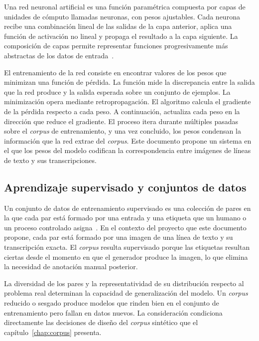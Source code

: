 Una red neuronal artificial es una función paramétrica compuesta por capas de unidades de cómputo llamadas neuronas, con pesos ajustables. Cada neurona recibe una combinación lineal de las salidas de la capa anterior, aplica una función de activación no lineal y propaga el resultado a la capa siguiente. La composición de capas permite representar funciones progresivamente más abstractas de los datos de entrada~\cite{goodfellow2016deeplearning}.

El entrenamiento de la red consiste en encontrar valores de los pesos que minimizan una función de pérdida. La función mide la discrepancia entre la salida que la red produce y la salida esperada sobre un conjunto de ejemplos. La minimización opera mediante retropropagación. El algoritmo calcula el gradiente de la pérdida respecto a cada peso. A continuación, actualiza cada peso en la dirección que reduce el gradiente. El proceso itera durante múltiples pasadas sobre el \textit{corpus} de entrenamiento, y una vez concluido, los pesos condensan la información que la red extrae del \textit{corpus}. Este documento propone un sistema en el que los pesos del modelo codifican la correspondencia entre imágenes de líneas de texto y sus transcripciones.

\subsection{Aprendizaje supervisado y conjuntos de datos}

Un conjunto de datos de entrenamiento supervisado es una colección de pares en la que cada par está formado por una entrada y una etiqueta que un humano o un proceso controlado asigna~\cite{goodfellow2016deeplearning}. En el contexto del proyecto que este documento propone, cada par está formado por una imagen de una línea de texto y su transcripción exacta. El \textit{corpus} resulta supervisado porque las etiquetas resultan ciertas desde el momento en que el generador produce la imagen, lo que elimina la necesidad de anotación manual posterior.

La diversidad de los pares y la representatividad de su distribución respecto al problema real determinan la capacidad de generalización del modelo. Un \textit{corpus} reducido o sesgado produce modelos que rinden bien en el conjunto de entrenamiento pero fallan en datos nuevos. La consideración condiciona directamente las decisiones de diseño del \textit{corpus} sintético que el capítulo~\ref{chap:corpus} presenta.

